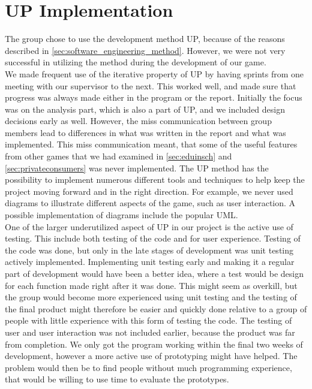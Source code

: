 \section{UP Implementation}
\label{sec:problems_with_UP}

The group chose to use the development method UP, because of the reasons described in \autoref{sec:software_engineering_method}. However, we were not very successful in utilizing the method during the development of our game.\\

We made frequent use of the iterative property of UP by having sprints from one meeting with our supervisor to the next. This worked well, and made sure that progress was always made either in the program or the report. Initially the focus was on the analysis part, which is also a part of UP, and we included design decisions early as well. However, the miss communication between group members lead to differences in what was written in the report and what was implemented. This miss communication meant, that some of the useful features from other games that we had examined in \autoref{sec:eduinsch} and \autoref{sec:privateconsumers} was never implemented. The UP method has the possibility to implement numerous different tools and techniques to help keep the project moving forward and in the right direction. For example, we never used diagrams to illustrate different aspects of the game, such as user interaction. A possible implementation of diagrams include the popular UML.\\

One of the larger underutilized aspect of UP in our project is the active use of testing. This include both testing of the code and for user experience. Testing of the code was done, but only in the late stages of development was unit testing actively implemented. Implementing unit testing early and making it a regular part of development would have been a better idea, where a test would be design for each function made right after it was done. This might seem as overkill, but the group would become more experienced using unit testing and the testing of the final product might therefore be easier and quickly done relative to a group of people with little experience with this form of testing the code. The testing of user and user interaction was not included earlier, because the product was far from completion. We only got the program working within the final two weeks of development, however a more active use of prototyping might have helped. The problem would then be to find people without much programming experience, that would be willing to use time to evaluate the prototypes.\\


